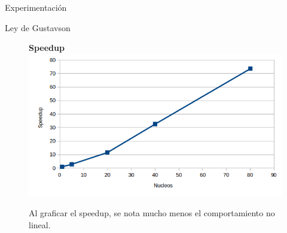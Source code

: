 \begin{section}{Experimentación}
\begin{subsection}{Ley de Gustavson}
\begin{figure}
\textbf{Speedup}
\includegraphics[width=\textwidth/2,height=\textheight/2,keepaspectratio]{figures/exp_gustafson_speedup}
\caption{Al graficar el speedup, se nota mucho menos el comportamiento no lineal.}
\label{fig:exp_gustafson_speedup}
\end{figure}

\end{subsection}
\end{section}
